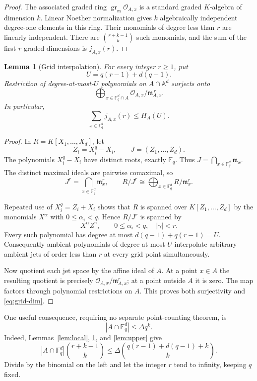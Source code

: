 \documentclass[11pt]{article}
\newcommand{\F}{\mathbb F}
\newcommand{\A}{\mathbb A}
\newcommand{\cO}{\mathcal O}
\newcommand{\fm}{\mathfrak m}
\newcommand{\gr}{\operatorname{gr}}
\newtheorem{lemma}[theorem]{Lemma}
\theoremstyle{remark}
\begin{document}
\begin{proof}
The associated graded ring $\gr_{\fm}\cO_{A,x}$ is a standard
graded $K$-algebra of dimension $k$. Linear Noether normalization
gives $k$ algebraically independent degree-one elements in this
ring. Their monomials of degree less than $r$ are linearly
independent. There are $\binom{r+k-1}{k}$ such monomials, and
the sum of the first $r$ graded dimensions is $j_{A,x}(r)$.
\end{proof}

\begin{lemma}[Grid interpolation]\label{lem:grid}
For every integer $r\ge1$, put
\begin{equation}\label{eq:U}
 U=q(r-1)+d(q-1).
\end{equation}
Restriction of degree-at-most-$U$ polynomials on $A\cap\A^d$
surjects onto
\[
 \bigoplus_{x\in\F_q^d\cap A}
 \cO_{A,x}/\fm_{A,x}^{\,r}.
\]
In particular,
\begin{equation}\label{eq:grid-dim}
 \sum_{x\in\F_q^d}j_{A,x}(r)\le H_A(U).
\end{equation}
\end{lemma}

\begin{proof}
In $R=K[X_1,\ldots,X_d]$, let
\[
 Z_i=X_i^q-X_i,\qquad J=(Z_1,\ldots,Z_d).
\]
The polynomials $X_i^q-X_i$ have distinct roots, exactly $\F_q$.
Thus $J=\bigcap_{x\in\F_q^d}\fm_x$. The distinct maximal ideals
are pairwise comaximal, so
\[
 J^r=\bigcap_{x\in\F_q^d}\fm_x^r,\qquad
 R/J^r\cong\bigoplus_{x\in\F_q^d}R/\fm_x^r.
\]

Repeated use of $X_i^q=Z_i+X_i$ shows that $R$ is spanned over
$K[Z_1,\ldots,Z_d]$ by the monomials $X^\alpha$ with
$0\le\alpha_i<q$. Hence $R/J^r$ is spanned by
\[
 X^\alpha Z^\gamma,
 \qquad 0\le\alpha_i<q,\quad |\gamma|<r.
\]
Every such polynomial has degree at most
$d(q-1)+q(r-1)=U$. Consequently ambient polynomials of degree at
most $U$ interpolate arbitrary ambient jets of order less than $r$
at every grid point simultaneously.

Now quotient each jet space by the affine ideal of $A$. At a
point $x\in A$ the resulting quotient is precisely
$\cO_{A,x}/\fm_{A,x}^r$; at a point outside $A$ it is zero.
The map factors through polynomial restrictions on $A$.
This proves both surjectivity and \eqref{eq:grid-dim}.
\end{proof}

One useful consequence, requiring no separate point-counting theorem, is
\begin{equation}\label{eq:point-count}
 |A\cap\F_q^d|\le\Delta q^k.
\end{equation}
Indeed, Lemmas~\ref{lem:local}, \ref{lem:grid}, and \ref{lem:upper}
give
\[
 |A\cap\F_q^d|\binom{r+k-1}{k}
 \le\Delta\binom{q(r-1)+d(q-1)+k}{k}.
\]
Divide by the binomial on the left and let the integer $r$ tend
to infinity, keeping $q$ fixed.
\end{document}
